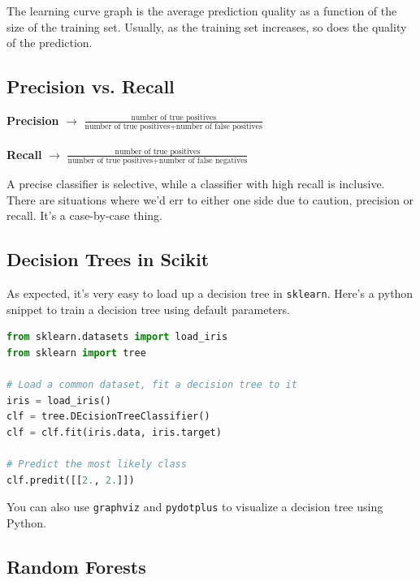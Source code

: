\documentclass[english, 10pt]{article}
\begin{document}
The learning curve graph is the average prediction quality as a function of the size of the training set. Usually, as the training set increases, so does the quality of the prediction.

\subsection{Precision vs. Recall}

\hfill \begin{tcolorbox}[title=Definitions:,colframe=red!75!black,colback=red!5!white,arc=0pt,fonttitle=\bfseries]
\textbf{Precision} $\rightarrow$ $\frac{\text{number of true positives}}{\text{number of true positives}+\text{number of false positives}}$\\\\
\textbf{Recall} $\rightarrow$ $\frac{\text{number of true positives}}{\text{number of true positives}+\text{number of false negatives}}$
\end{tcolorbox}

\hfill \break A precise classifier is selective, while a classifier with high recall is inclusive. There are situations where we'd err to either one side due to caution, precision or recall. It's a case-by-case thing.

\subsection{Decision Trees in Scikit}

As expected, it's very easy to load up a decision tree in \texttt{sklearn}. Here's a python snippet to train a decision tree using default parameters.\\

{\centering
\begin{lstlisting}[language=python]
from sklearn.datasets import load_iris
from sklearn import tree

# Load a common dataset, fit a decision tree to it
iris = load_iris()
clf = tree.DEcisionTreeClassifier()
clf = clf.fit(iris.data, iris.target)

# Predict the most likely class
clf.predit([[2., 2.]])
\end{lstlisting}
}

You can also use \texttt{graphviz} and \texttt{pydotplus} to visualize a decision tree using Python.

\subsection{Random Forests}
\end{document}
